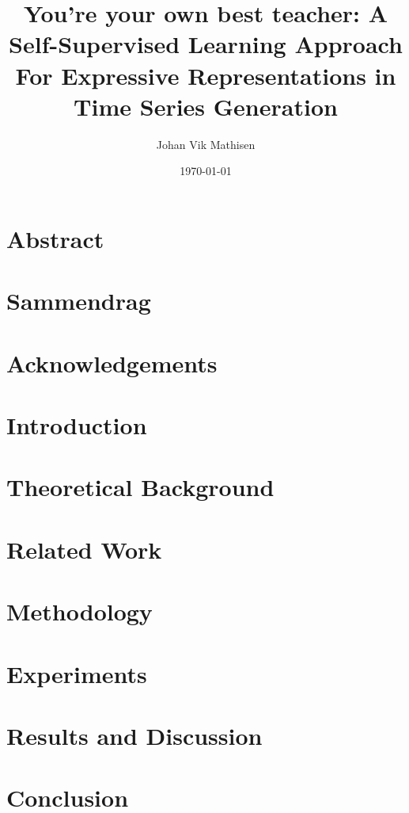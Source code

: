 \documentclass[british,titlepage]{ntnuthesis}
\title{You're your own best teacher: A Self-Supervised Learning Approach For Expressive Representations in Time Series Generation}
\author{Johan Vik Mathisen}
\date{\today}
\begin{document}
\chapter*{Abstract}

\chapter*{Sammendrag}

\chapter*{Acknowledgements}


\tableofcontents

\chapter{Introduction}


\chapter{Theoretical Background}


\chapter{Related Work}


\chapter{Methodology}


\chapter{Experiments}


\chapter{Results and Discussion}


\chapter{Conclusion}


\chapter*{\bibname}
\printbibliography[heading=none]

% 

% 
\end{document}
